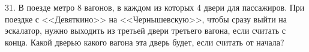 31. В поезде метро 8 вагонов, в каждом из которых 4 двери для пассажиров. При поездке с <<Девяткино>> на <<Чернышевскую>>, чтобы сразу выйти на эскалатор, нужно выходить из третьей двери третьего вагона, если считать с конца. Какой дверью какого вагона эта дверь будет, если считать от начала?\\
